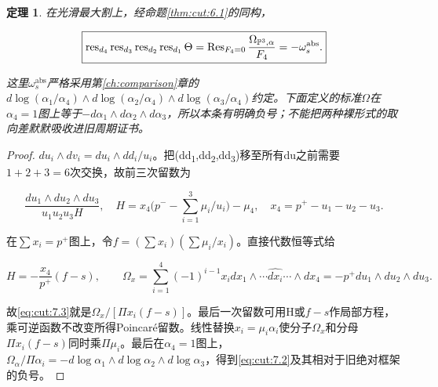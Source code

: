 \documentclass[11pt,a4paper,oneside]{ctexrep}
\theoremstyle{cnplain}
\newtheorem{theorem}{定理}[chapter]
\theoremstyle{definition}
\theoremstyle{remark}
\begin{document}
\begin{theorem}

\label{thm:cut:7.1} 在光滑最大割上，经命题\ref{thm:cut:6.1}的同构，

\begin{equation}
\boxed{\operatorname{res}_{d_4}\operatorname{res}_{d_3}
 \operatorname{res}_{d_2}\operatorname{res}_{d_1}\Theta
       =\operatorname{Res}_{F_4=0}
                     \frac{\Omega_{\mathbb P^3,\alpha}}{F_4}
       =-\omega_s^{\rm abs}.}
                                                               \label{eq:cut:7.2}
\end{equation}

这里\(\omega _s^{\mathrm{abs}}\)严格采用第\ref{ch:comparison}章的\(d\log (\alpha _{1}/\alpha _{4})\wedge d\log (\alpha _{2}/\alpha _{4})\wedge d\log (\alpha _{3}/\alpha _{4})\)约定。下面定义的标准\(\Omega \)在\(\alpha _{4}=1\)图上等于\(- d\alpha _{1}\wedge d\alpha _{2}\wedge d\alpha _{3}\)，所以本条有明确负号；不能把两种裸形式的取向差默默吸收进旧周期证书。

\end{theorem}

\begin{proof}

\(du_i\wedge dv_i=du_i\wedge dd_i/u_i\)。把(dd\textsubscript{1},dd\textsubscript{2},dd\textsubscript{3})移至所有du之前需要\(1+2+3=6\)次交换，故前三次留数为

\begin{equation}
\frac{du_1\wedge du_2\wedge du_3}{u_1u_2u_3H},\quad
 H=x_4\Big(p^- -\sum_{i=1}^3\mu_i/u_i\Big)-\mu_4,
 \quad x_4=p^+-u_1-u_2-u_3.                           \label{eq:cut:7.3}
\end{equation}

在\(\sum x_i=p^+\)图上，令\(f=(\sum x_i)(\sum \mu _i/x_i)\)。直接代数恒等式给

\begin{equation}
H=-\frac{x_4}{p^+}(f-s),\qquad
 \Omega_x=\sum_{i=1}^4(-1)^{i-1}x_i
             dx_1\wedge\cdots\widehat{dx_i}\cdots\wedge dx_4
            =-p^+du_1\wedge du_2\wedge du_3.           \label{eq:cut:7.4}
\end{equation}

故\eqref{eq:cut:7.3}就是\(\Omega _x/[\Pi x_i(f- s)]\)。最后一次留数可用H或\(f- s\)作局部方程，乘可逆函数不改变所得Poincaré留数。线性替换\(x_i=\mu _i\alpha _i\)使分子\(\Omega _x\)和分母\(\Pi x_i(f- s)\)同时乘\(\Pi \mu _i\)。最后在\(\alpha _{4}=1\)图上，\(\Omega _\alpha /\Pi \alpha _i=- d\log \alpha _{1}\wedge d\log \alpha _{2}\wedge d\log \alpha _{3}\)，得到\eqref{eq:cut:7.2}及其相对于旧绝对框架的负号。

\end{proof}
\end{document}
